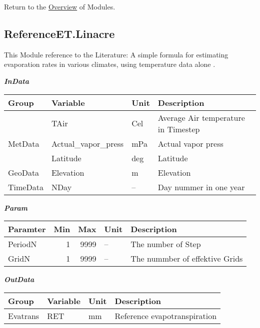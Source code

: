 \documentclass[
]{book}
\begin{document}
Return to the \protect\hyperlink{module}{Overview} of Modules.

\hypertarget{ReferenceET.Linacre}{%
\subsection{ReferenceET.Linacre}\label{ReferenceET.Linacre}}

This Module reference to the Literature: A simple formula for estimating evaporation rates in various climates, using temperature data alone \citep{Linacre.1977}.

\textbf{\emph{InData}}

\begin{table}[!h]
\centering
\begin{tabular}{l|l|l|l}
\hline
Group & Variable & Unit & Description\\
\hline
 & TAir & Cel & Average Air temperature in Timestep\\
\cline{2-4}
\multirow{-2}{*}{\raggedright\arraybackslash MetData} & Actual\_vapor\_press & mPa & Actual vapor press\\
\cline{1-4}
 & Latitude & deg & Latitude\\
\cline{2-4}
\multirow{-2}{*}{\raggedright\arraybackslash GeoData} & Elevation & m & Elevation\\
\cline{1-4}
TimeData & NDay & -- & Day nummer in one year\\
\hline
\end{tabular}
\end{table}

\textbf{\emph{Param}}

\begin{table}[!h]
\centering
\begin{tabular}{l|r|r|l|l}
\hline
Paramter & Min & Max & Unit & Description\\
\hline
PeriodN & 1 & 9999 & -- & The number of Step\\
\cline{1-5}
GridN & 1 & 9999 & -- & The nummber of effektive Grids\\
\hline
\end{tabular}
\end{table}

\textbf{\emph{OutData}}

\begin{table}[!h]
\centering
\begin{tabular}{l|l|l|l}
\hline
Group & Variable & Unit & Description\\
\hline
Evatrans & RET & mm & Reference evapotranspiration\\
\hline
\end{tabular}
\end{table}
\end{document}
